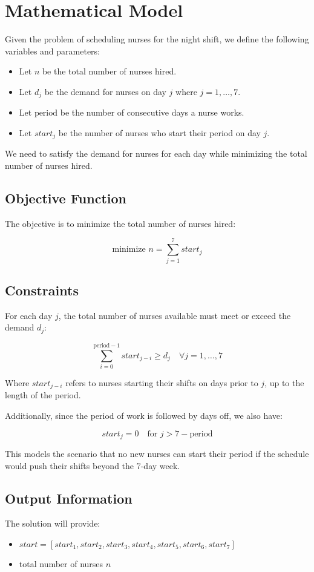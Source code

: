 \documentclass{article}
\begin{document}
\section*{Mathematical Model}

Given the problem of scheduling nurses for the night shift, we define the following variables and parameters:

\begin{itemize}
    \item Let \( n \) be the total number of nurses hired.
    \item Let \( d_j \) be the demand for nurses on day \( j \) where \( j = 1, \ldots, 7 \).
    \item Let \( \text{period} \) be the number of consecutive days a nurse works.
    \item Let \( start_j \) be the number of nurses who start their period on day \( j \).
\end{itemize}

We need to satisfy the demand for nurses for each day while minimizing the total number of nurses hired.

\subsection*{Objective Function}

The objective is to minimize the total number of nurses hired:

\[
\text{minimize } n = \sum_{j=1}^{7} start_j
\]

\subsection*{Constraints}

For each day \( j \), the total number of nurses available must meet or exceed the demand \( d_j \):

\[
\sum_{i=0}^{\text{period}-1} start_{j-i} \geq d_j \quad \forall j = 1, \ldots, 7
\]

Where \( start_{j-i} \) refers to nurses starting their shifts on days prior to \( j \), up to the length of the period.

Additionally, since the period of work is followed by days off, we also have:

\[
start_j = 0 \quad \text{for } j > 7 - \text{period}
\]

This models the scenario that no new nurses can start their period if the schedule would push their shifts beyond the 7-day week.

\subsection*{Output Information}

The solution will provide:

\begin{itemize}
    \item \( start = [start_1, start_2, start_3, start_4, start_5, start_6, start_7] \)
    \item total number of nurses \( n \)
\end{itemize}
\end{document}
